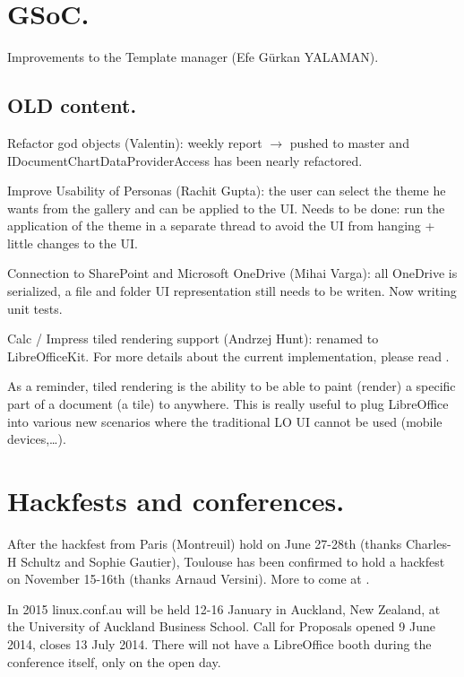 \documentclass{article}
\begin{document}
\section{GSoC.}

Improvements to the Template manager (Efe Gürkan YALAMAN)\cite{gsocTemplateManager}.


\subsection{OLD content.}

Refactor god objects (Valentin): weekly report $\rightarrow$ pushed to master
and IDocumentChartDataProviderAccess has been nearly refactored.

Improve Usability of Personas (Rachit Gupta): the user can select the theme he
wants from the gallery and can be applied to the UI.  Needs to be done: run the
application of the theme in a separate thread to avoid the UI from hanging
+ little changes to the UI.

Connection to SharePoint and Microsoft OneDrive (Mihai Varga): all OneDrive is
serialized, a file and folder UI representation still needs to be writen. Now
writing unit tests.

Calc / Impress tiled rendering support (Andrzej Hunt): renamed to
LibreOfficeKit. For more details about the current implementation, please read
\cite{tiledRenderingArticle}.

As a reminder, tiled rendering is the ability to be able to paint (render)
a specific part of a document (a tile) to anywhere. This is really useful to
plug LibreOffice into various new scenarios where the traditional LO UI cannot
be used (mobile devices,\ldots).



\section{Hackfests and conferences.}

After the hackfest from Paris (Montreuil) hold on June 27-28th (thanks
Charles-H Schultz and Sophie Gautier), Toulouse has been confirmed to hold
a hackfest on November 15-16th\cite{hackfestToulouse} (thanks Arnaud Versini).
More to come at \cite{hackfestToulouseWiki}.

In 2015 linux.conf.au will be held 12-16 January in Auckland, New Zealand, at
the University of Auckland Business School.  Call for Proposals opened 9 June
2014, closes 13 July 2014\cite{linuxConfAuckland1}. There will not have
a LibreOffice booth during the conference itself, only on the open
day\cite{linuxConfAuckland2}.
\end{document}
